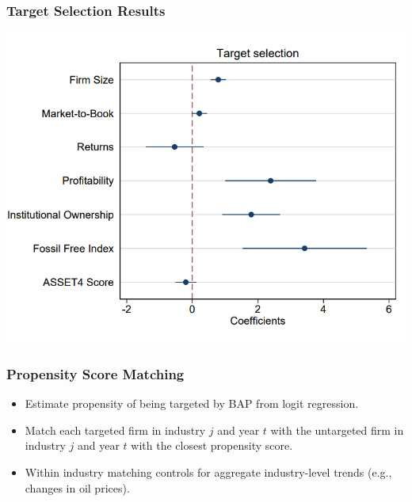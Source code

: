\documentclass{beamer}
\begin{document}
\begin{frame}
\frametitle{Target Selection Results}
\centering
\includegraphics[scale = .25]{target_selection}

\end{frame}


\begin{frame}
\frametitle{Propensity Score Matching}

\begin{itemize}[<+->]
\item Estimate propensity of being targeted by BAP from logit regression.
\bigskip
\item Match each targeted firm in industry $j$ and year $t$ with the untargeted firm in industry $j$ and year $t$ with the closest propensity score.
\bigskip
\item Within industry matching controls for aggregate industry-level trends (e.g., changes in oil prices).
\end{itemize}


\end{frame}
\end{document}
